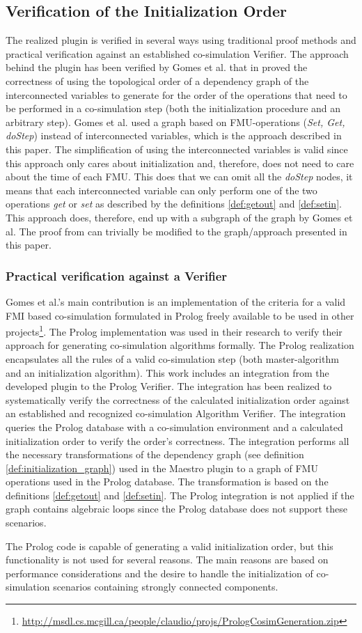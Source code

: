\subsection{Verification of the Initialization Order}
The realized plugin is verified in several ways using traditional proof methods and practical verification against an established co-simulation Verifier. The approach behind the plugin has been verified by Gomes et al. that in \cite{gomes_lucio_vangheluwe_2019} proved the correctness of using the topological order of a dependency graph of the interconnected variables to generate for the order of the operations that need to be performed in a co-simulation step (both the initialization procedure and an arbitrary step). Gomes et al. used a graph based on FMU-operations (\textit{Set, Get, doStep}) instead of interconnected variables, which is the approach described in this paper. The simplification of using the interconnected variables is valid since this approach only cares about initialization and, therefore, does not need to care about the time of each FMU. This does that we can omit all the \textit{doStep} nodes, it means that each interconnected variable can only perform one of the two operations \textit{get} or \textit{set} as described by the definitions \ref{def:getout} and \ref{def:setin}.
This approach does, therefore, end up with a subgraph of the graph by Gomes et al. The proof from \cite{gomes_lucio_vangheluwe_2019} can trivially be modified to the graph/approach presented in this paper.

\subsubsection{Practical verification against a Verifier} 
Gomes et al.'s main contribution is an implementation of the criteria for a valid FMI based co-simulation formulated in Prolog freely available to be used in other projects\footnote{\url{http://msdl.cs.mcgill.ca/people/claudio/projs/PrologCosimGeneration.zip}}. The Prolog implementation was used in their research to verify their approach for generating co-simulation algorithms formally. The Prolog realization encapsulates all the rules of a valid co-simulation step (both master-algorithm and an initialization algorithm). 
This work includes an integration from the developed plugin to the Prolog Verifier. The integration has been realized to systematically verify the correctness of the calculated initialization order against an established and recognized co-simulation Algorithm Verifier. The integration queries the Prolog database with a co-simulation environment and a calculated initialization order to verify the order's correctness. The integration performs all the necessary transformations of the dependency graph (see definition \ref{def:initialization_graph}) used in the Maestro plugin to a graph of FMU operations used in the Prolog database. The transformation is based on the definitions \ref{def:getout} and \ref{def:setin}. The Prolog integration is not applied if the graph contains algebraic loops since the Prolog database does not support these scenarios.

The Prolog code is capable of generating a valid initialization order, but this functionality is not used for several reasons. The main reasons are based on performance considerations and the desire to handle the initialization of co-simulation scenarios containing strongly connected components.